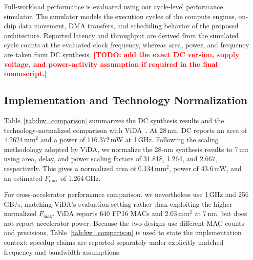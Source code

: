 \documentclass[conference]{IEEEtran}
\newcommand{\AreaTwentyEight}{4.2624\,mm$^2$}
\newcommand{\PowerTwentyEight}{116.372\,mW}
\newcommand{\AreaSevenNorm}{0.134\,mm$^2$}
\newcommand{\PowerSevenNorm}{43.6\,mW}
\newcommand{\FmaxSevenNorm}{1.264\,GHz}
\newcommand{\AreaScaleFactor}{31.818}
\newcommand{\DelayScaleFactor}{1.264}
\newcommand{\PowerScaleFactor}{2.667}
\newcommand{\TODO}[1]{\textcolor{red}{\textbf{[TODO: #1]}}}
\begin{document}
Full-workload performance is evaluated using our cycle-level performance
simulator. The simulator models the execution cycles of the compute engines,
on-chip data movement, DMA transfers, and scheduling behavior of the proposed
architecture. Reported latency and throughput are derived from the simulated
cycle counts at the evaluated clock frequency, whereas area, power, and
frequency are taken from DC synthesis.
\TODO{add the exact DC version, supply voltage, and power-activity assumption
if required in the final manuscript.}

\subsection{Implementation and Technology Normalization}
\label{subsec:hw_eval}

Table~\ref{tab:hw_comparison} summarizes the DC synthesis results and the
technology-normalized comparison with ViDA~\cite{ding2025vida}. At 28\,nm,
DC reports an area of \AreaTwentyEight{} and a power of
\PowerTwentyEight{} at 1\,GHz. Following the scaling methodology adopted by
ViDA, we normalize the 28-nm synthesis results to 7\,nm using area, delay,
and power scaling factors of \AreaScaleFactor{}, \DelayScaleFactor{}, and
\PowerScaleFactor{}, respectively.
This gives a normalized area of \AreaSevenNorm{}, power of
\PowerSevenNorm{}, and an estimated $F_{\max}$ of \FmaxSevenNorm{}.

For cross-accelerator performance comparison, we nevertheless use 1\,GHz and
256\,GB/s, matching ViDA's evaluation setting rather than exploiting the
higher normalized $F_{\max}$. ViDA reports 640 FP16 MACs and 2.03\,mm$^2$ at
7\,nm, but does not report accelerator power. Because the two designs use
different MAC counts and precisions, Table~\ref{tab:hw_comparison} is used to
state the implementation context; speedup claims are reported separately
under explicitly matched frequency and bandwidth assumptions.
\end{document}

